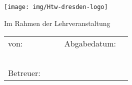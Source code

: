 \begin{titlepage}
    \thispagestyle{empty}
    \enlargethispage{35mm}
    \setlength{\headheight}{0mm}

    \sffamily



    \iftitlelogo{}
        \hspace{-1cm}\texttt{[image: img/Htw-dresden-logo]}
    \else
        {%
            \mdseries
            \Huge \MakeUppercase{\myDefUniversity}\\\vspace{0.5em}
        }
    \fi

    \vfill
    \vspace{10mm}
    \begin{center}
        \begin{huge}
            \myDefTitle{}
            \vfill
        \end{huge}
        \begin{Large}
            Im Rahmen der Lehrveranstaltung \\ 
            \myDefSeminar{}
            \vfill
        \end{Large}

    \end{center}

    \vfill
    \iftitlefinal{}
        \begin{small}
            \begin{tabularx}{\textwidth}{llXll}
            	von: & \myDefAuthorA{} & & Abgabedatum:  & \myDefDateHandIn{}\\
            	& \myDefAuthorB{} \\
            	& \myDefAuthorC{} \\
            	& \myDefAuthorD{} \\
            	& \myDefAuthorE{} \\
            	& \myDefAuthorF{} \\
                Betreuer:    & \myDefSupervisor{} \\
            \end{tabularx}
        \end{small}
        \vspace{2em}
    \fi
    \vspace{3em}

    \normalsize

\end{titlepage}

